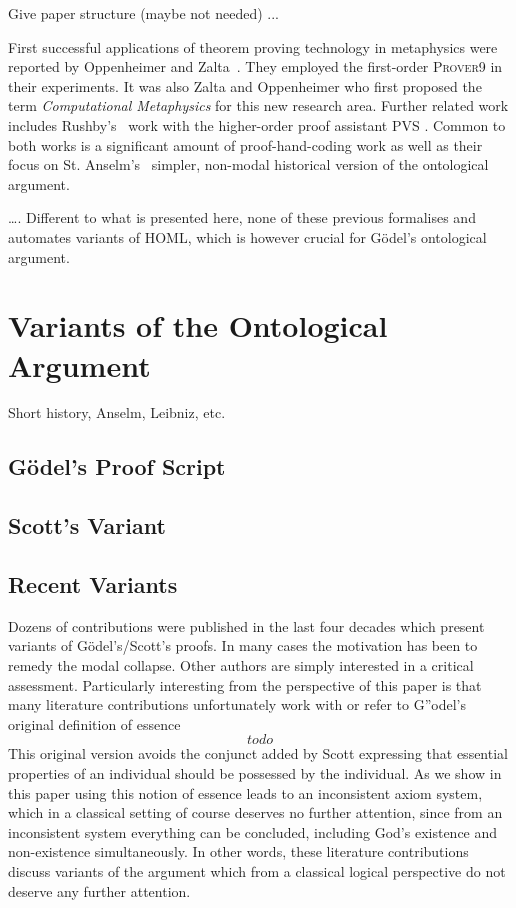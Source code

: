 \documentclass{article}
\begin{document}

Give paper structure (maybe not needed) ...


First successful applications of theorem proving technology in
metaphysics were reported by Oppenheimer and
Zalta~. They employed the first-order
\textsc{Prover9} \cite{Prover9} in their experiments. It was also
Zalta and Oppenheimer who first proposed the term
\textit{Computational Metaphysics} for this new research area. Further
related work includes Rushby's~ work with the
higher-order proof assistant \textsc{PVS} \cite{PVS}. Common to both
works is a significant amount of proof-hand-coding work as well as their
focus on St. Anselm's~ simpler, non-modal historical
version of the ontological argument.

\ldots. Different to what is presented here, none of these previous
formalises and automates variants of HOML, which is however crucial
for G\"{o}del's ontological argument.



\section{Variants of the Ontological Argument}
Short history, Anselm, Leibniz, etc.
\subsection{G\"{o}del's Proof Script}
\subsection{Scott's Variant}
\subsection{Recent Variants}
Dozens of contributions were published in the last four decades which
present variants of G\"odel's/Scott's proofs. In many cases the
motivation has been to remedy the modal collapse. Other authors are
simply interested in a critical assessment. Particularly interesting
from the perspective of this paper is that many literature
contributions unfortunately work with or refer to G''odel's original
definition of essence
$$ todo $$
This original version avoids the conjunct added by Scott expressing
that essential properties of an individual should be possessed by the
individual. As we show in this paper using this notion of essence
leads to an inconsistent axiom system, which in a classical setting of
course deserves no further attention, since from an inconsistent
system everything can be concluded, including God's existence and
non-existence simultaneously. In other words, these literature
contributions discuss variants of the argument which from a classical
logical perspective do not deserve any further attention.
\end{document}
